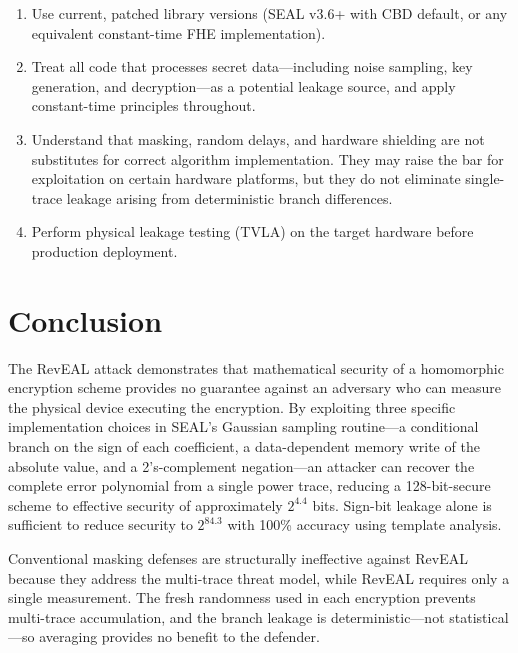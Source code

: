 \documentclass[sigconf,nonacm]{acmart}
\begin{document}
\begin{enumerate}
  \item Use current, patched library versions (SEAL v3.6+ with CBD default, or any
        equivalent constant-time FHE implementation).
  \item Treat all code that processes secret data---including noise sampling, key
        generation, and decryption---as a potential leakage source, and apply
        constant-time principles throughout.
  \item Understand that masking, random delays, and hardware shielding are not
        substitutes for correct algorithm implementation. They may raise the bar for
        exploitation on certain hardware platforms, but they do not eliminate
        single-trace leakage arising from deterministic branch differences.
  \item Perform physical leakage testing (TVLA) on the target hardware before
        production deployment.
\end{enumerate}

\section{Conclusion}

The RevEAL attack demonstrates that mathematical security of a homomorphic encryption
scheme provides no guarantee against an adversary who can measure the physical device
executing the encryption. By exploiting three specific implementation choices in
SEAL's Gaussian sampling routine---a conditional branch on the sign of each
coefficient, a data-dependent memory write of the absolute value, and a 2's-complement
negation---an attacker can recover the complete error polynomial from a single power
trace, reducing a 128-bit-secure scheme to effective security of approximately
$2^{4.4}$ bits. Sign-bit leakage alone is sufficient to reduce security to
$2^{84.3}$ with 100\% accuracy using template analysis.

Conventional masking defenses are structurally ineffective against RevEAL because
they address the multi-trace threat model, while RevEAL requires only a single
measurement. The fresh randomness used in each encryption prevents multi-trace
accumulation, and the branch leakage is deterministic---not statistical---so
averaging provides no benefit to the defender.
\end{document}
